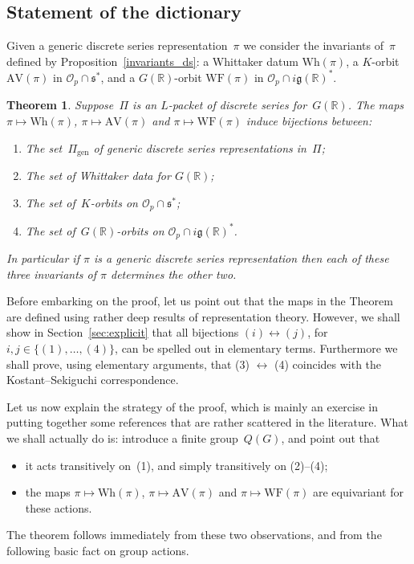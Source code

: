 \documentclass[10pt,leqno]{article}
\newtheorem{theorem}[equation]{Theorem}
\numberwithin{equation}{section}
\newcommand{\R}{\mathbb R}
\newcommand{\g}{\mathfrak g}
\newcommand{\s}{\mathfrak s}
\newcommand{\AV}{\mathrm{AV}}
\newcommand{\Wh}{\mathrm{Wh}}
\newcommand{\WF}{\mathrm{WF}}
\begin{document}
\subsection{Statement of the dictionary}  



Given a generic discrete series representation~$\pi$ we consider the invariants of~$\pi$ defined by Proposition~\ref{invariants_ds}: a Whittaker datum  $\Wh(\pi)$, a $K$-orbit $\AV(\pi)$ in $\mathcal{O}_p \cap \s^*$, and a $G(\R)$-orbit $\WF(\pi)$ in $\mathcal{O}_p \cap  i \g(\R)^*$.


\begin{theorem} \label{th:main} Suppose~$\Pi$ is an $L$-packet of discrete series for~$G(\R)$. 
The maps $\pi \mapsto \Wh(\pi)$, $\pi \mapsto \AV(\pi)$ and $\pi\mapsto \WF(\pi)$ induce bijections between\textup{:}
\begin{enumerate}
\item[(1)] The set~$\Pi_{\mathrm{gen}}$ of generic discrete series representations in~$\Pi$\textup{;}
\item[(2)] The set of Whittaker data for $G(\R)$\textup{;}
\item[(3)] The set of~$K$-orbits on $\mathcal{O}_p \cap \s^*$\textup{;}
\item[(4)] The set of~$G(\R)$-orbits on $\mathcal{O}_p \cap  i \g(\R)^*$\textup{.}
\end{enumerate}
In particular if $\pi$ is a generic discrete series representation then each of these three invariants of $\pi$ determines the other two. 
\end{theorem}

Before embarking on the proof, let us point out that the maps in the
Theorem are defined using rather deep results of representation
theory. However, we shall show in Section~\ref{sec:explicit} that all
bijections $(i) \leftrightarrow (j)$, for $i,j \in \{(1), \dots,
(4)\}$, can be spelled out in elementary terms. Furthermore we shall
prove, using elementary arguments, that (3) $\leftrightarrow$ (4)
coincides with the Kostant--Sekiguchi correspondence.



Let us now explain the strategy of the proof, which is mainly an exercise in putting together some references that are rather scattered in the literature. What we shall actually do is: introduce a finite group~$Q(G)$, and point out that 
\begin{itemize}
\item[(i)] it acts transitively on~(1), and simply transitively on (2)--(4);
\item[(ii)] the maps $\pi \mapsto \Wh(\pi)$, $\pi \mapsto \AV(\pi)$ and $\pi\mapsto \WF(\pi)$  are equivariant for these actions.
\end{itemize}
The theorem follows immediately from these two observations, and from the following basic fact on group actions.
\end{document}
